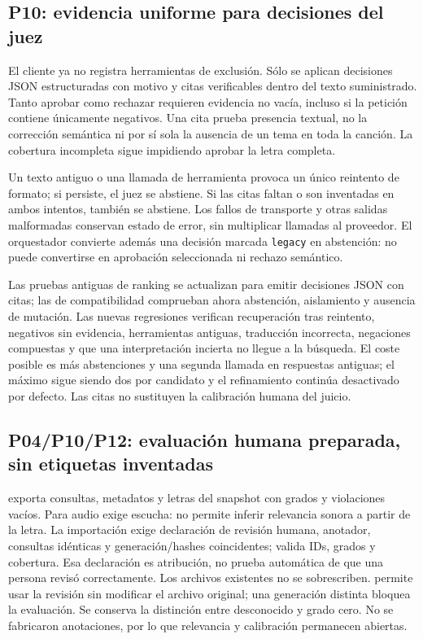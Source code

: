 \subsection{P10: evidencia uniforme para decisiones del juez}
El cliente ya no registra herramientas de exclusión. Sólo se aplican decisiones
JSON estructuradas con motivo y citas verificables dentro del texto suministrado.
Tanto aprobar como rechazar requieren evidencia no vacía, incluso si la petición
contiene únicamente negativos. Una cita prueba presencia textual, no la
corrección semántica ni por sí sola la ausencia de un tema en toda la canción.
La cobertura incompleta sigue impidiendo aprobar la letra completa.

Un texto antiguo o una llamada de herramienta provoca un único reintento de
formato; si persiste, el juez se abstiene. Si las citas faltan o son inventadas
en ambos intentos, también se abstiene. Los fallos de transporte y otras salidas
malformadas conservan estado de error, sin multiplicar llamadas al proveedor.
El orquestador convierte además una decisión marcada \texttt{legacy} en abstención:
no puede convertirse en aprobación seleccionada ni rechazo semántico.

Las pruebas antiguas de ranking se actualizan para emitir decisiones JSON con
citas; las de compatibilidad comprueban ahora abstención, aislamiento y ausencia
de mutación. Las nuevas regresiones verifican recuperación tras reintento,
negativos sin evidencia, herramientas antiguas, traducción incorrecta, negaciones
compuestas y que una interpretación incierta no llegue a la búsqueda.
El coste posible es más abstenciones y una segunda llamada en respuestas antiguas;
el máximo sigue siendo dos por candidato y el refinamiento continúa desactivado
por defecto. Las citas no sustituyen la calibración humana del juicio.

\subsection{P04/P10/P12: evaluación humana preparada, sin etiquetas inventadas}
 exporta consultas, metadatos y letras del snapshot
con grados y violaciones vacíos. Para audio exige escucha: no permite inferir
relevancia sonora a partir de la letra. La importación exige declaración de
revisión humana, anotador, consultas idénticas y generación/hashes coincidentes;
valida IDs, grados y cobertura. Esa declaración es atribución, no prueba automática
de que una persona revisó correctamente. Los archivos existentes no se sobrescriben.
 permite usar la revisión sin modificar el archivo
original; una generación distinta bloquea la evaluación.
Se conserva la distinción entre desconocido y grado cero. No se fabricaron
anotaciones, por lo que relevancia y calibración permanecen abiertas.


